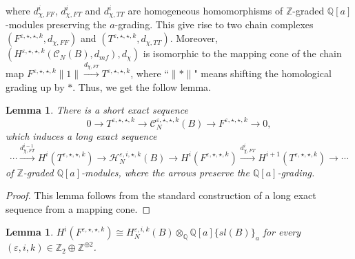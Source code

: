 \documentclass{amsart}
\theoremstyle{plain}
\newtheorem{lemma}[theorem]{Lemma}
\theoremstyle{definition}
\theoremstyle{remark}
\numberwithin{equation}{section}
\begin{document}
where $d_{\chi,FF}^i$, $d_{\chi,FT}^i$ and $d_{\chi,TT}^i$ are homogeneous homomorphisms of ${\mathbb{Z}}$-graded ${\mathbb{Q}}[a]$-modules preserving the $a$-grading. This give rise to two chain complexes $(F^{{\varepsilon},\star,\star,k}, d_{\chi,FF})$ and $(T^{{\varepsilon},\star,\star,k}, d_{\chi,TT})$. Moreover, $(H^{{\varepsilon},\star,\star,k}({\mathcal{C}}_N(B),d_{mf}), d_\chi)$ is isomorphic to the mapping cone of the chain map $F^{{\varepsilon},\star,\star,k}\|1\| \xrightarrow{d_{\chi,FT}} T^{{\varepsilon},\star,\star,k}$, where ``$\|\ast\|$" means shifting the homological grading up by $\ast$. Thus, we get the follow lemma.

\begin{lemma}\label{lemma-FT-exact-seq}
There is a short exact sequence
\[
0\rightarrow T^{{\varepsilon},\star,\star,k} \rightarrow {\mathcal{C}}_N^{{\varepsilon},\star,\star,k}(B) \rightarrow F^{{\varepsilon},\star,\star,k} \rightarrow 0,
\]
which induces a long exact sequence
\[
\cdots \xrightarrow{d_{\chi,FT}^{i-1}} H^i(T^{{\varepsilon},\star,\star,k}) \rightarrow {\mathcal{H}}_N^{{\varepsilon},i,\star,k}(B) \rightarrow H^i(F^{{\varepsilon},\star,\star,k}) \xrightarrow{d_{\chi,FT}^{i}} H^{i+1}(T^{{\varepsilon},\star,\star,k}) \rightarrow \cdots
\]
of ${\mathbb{Z}}$-graded ${\mathbb{Q}}[a]$-modules, where the arrows preserve the ${\mathbb{Q}}[a]$-grading.
\end{lemma}

\begin{proof}
This lemma follows from the standard construction of a long exact sequence from a mapping cone. 
\end{proof}

\begin{lemma}\label{lemma-free-homology}
$H^i(F^{{\varepsilon},\star,\star,k}) \cong H_N^{{\varepsilon},i,k}(B)\otimes_{\mathbb{Q}} {\mathbb{Q}}[a]\{sl(B)\}_a$ for every $({\varepsilon},i,k) \in {\mathbb{Z}}_2 \oplus {\mathbb{Z}}^{\oplus 2}$.
\end{lemma}
\end{document}
